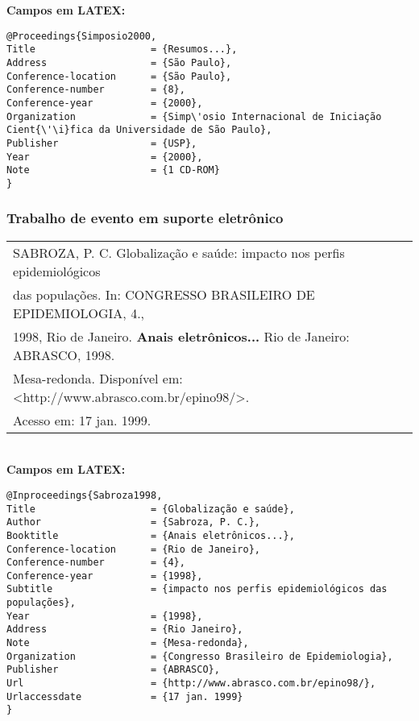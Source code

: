 \textbf{Campos em LATEX:} 

\begingroup
\fontsize{10pt}{12pt}\selectfont
\begin{verbatim}
@Proceedings{Simposio2000,
Title                    = {Resumos...},
Address                  = {São Paulo},
Conference-location      = {São Paulo},
Conference-number        = {8},
Conference-year          = {2000},
Organization             = {Simp\'osio Internacional de Iniciação 
Cient{\'\i}fica da Universidade de São Paulo},
Publisher                = {USP},
Year                     = {2000},
Note                     = {1 CD-ROM}
}\end{verbatim}
\endgroup

\subsubsection{Trabalho de evento em suporte eletrônico }

\begin{tabular}{|l|c|} \hline
SABROZA, P. C. Globalização e saúde: impacto nos perfis
epidemiológicos \\das populações. In: CONGRESSO BRASILEIRO DE
EPIDEMIOLOGIA, 4., \\1998, Rio de Janeiro. \textbf{Anais eletrônicos...} Rio de
Janeiro: ABRASCO, 1998. \\Mesa-redonda. Disponível em:
<http://www.abrasco.com.br/epino98/>. \\Acesso em: 17 jan. 1999.\\\hline 
\end{tabular} \\

\textbf{Campos em LATEX:} 

\begingroup
\fontsize{10pt}{12pt}\selectfont
\begin{verbatim}
@Inproceedings{Sabroza1998,
Title                    = {Globalização e saúde},
Author                   = {Sabroza, P. C.},
Booktitle                = {Anais eletrônicos...},
Conference-location      = {Rio de Janeiro},
Conference-number        = {4},
Conference-year          = {1998},
Subtitle                 = {impacto nos perfis epidemiológicos das 
populações},
Year                     = {1998},
Address                  = {Rio Janeiro},
Note                     = {Mesa-redonda},
Organization             = {Congresso Brasileiro de Epidemiologia},
Publisher                = {ABRASCO},
Url                      = {http://www.abrasco.com.br/epino98/},
Urlaccessdate            = {17 jan. 1999}
}
\end{verbatim}
\endgroup
	
